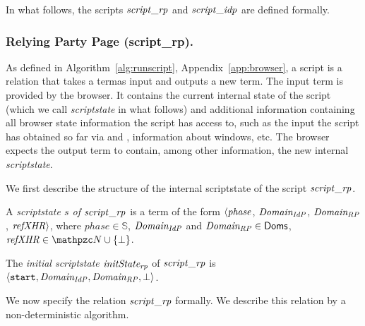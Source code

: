   In what follows, the scripts $\mathit{script\_rp}$ and $\mathit{script\_idp}$ are  defined formally.
  
  \subsubsection{Relying Party Page (script\_rp).}\label{app:uppresso-script-rp}
  As defined in Algorithm~\ref{alg:runscript}, Appendix~\ref{app:browser}, a script is a relation that takes a termas input and outputs 
  a new term. The input term is provided by the browser. It contains the current 
  internal state of the script (which we call \emph{scriptstate} in what follows) and
  additional information containing all browser state information the
  script has access to, such as the input the script has obtained so far
  via \xhrs and \pms, information about windows, etc. The browser
  expects the output term to contain, among other information, the new internal \emph{scriptstate}.
  
  We first describe the structure of the internal scriptstate
  of the script $\mathit{script\_rp}$.
  
  \begin{definition} \label{def:scriptstaterp} 
  A \emph{scriptstate $s$ of $\mathit{script\_rp}$} is a term of the form $\langle 
  \mathit{phase}$, 
  $\mathit{Domain_{IdP}}$,
  $\mathit{Domain_{RP}}$, 
  $\mathit{refXHR}\rangle$, 
  where $phase \in \mathbb{S}$, 
  $\mathit{Domain_{IdP}}$ and
  $\mathit{Domain_{RP}} \in \mathsf{Doms}$,
  $\mi{refXHR}\in \nonces \cup \{\bot\}$. 
  
  The \emph{initial scriptstate $\mathit{initState_{rp}}$} of $\mathit{script\_rp}$ is 
  $\langle\mathtt{start},
  \mathit{Domain_{IdP}},
  \mathit{Domain_{RP}}, 
  \bot\rangle$.
  \end{definition}
  
  We now specify the relation $\mathit{script\_rp}$ formally. We describe this relation
  by a non-deterministic algorithm.
  
